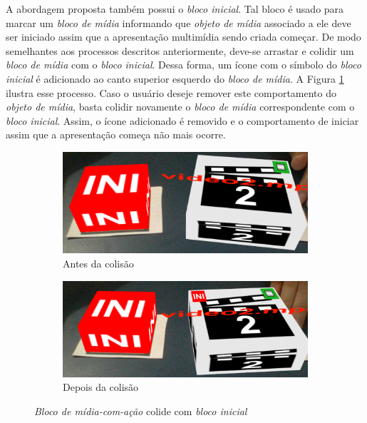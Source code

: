 \documentclass[../main.tex]{subfiles}
\begin{document}
A abordagem proposta também possui o \emph{bloco inicial}. Tal bloco é usado para marcar um \emph{bloco de mídia} informando que \emph{objeto de mídia} associado a ele deve ser iniciado assim que a apresentação multimídia sendo criada começar. De modo semelhantes aos processos descritos anteriormente, deve-se arrastar e colidir um \emph{bloco de mídia} com o \emph{bloco inicial}. Dessa forma, um ícone com o símbolo do \emph{bloco inicial} é adicionado ao canto superior esquerdo do \emph{bloco de mídia}. A Figura \ref{fig:inicial} ilustra esse processo. Caso o usuário deseje remover este comportamento do \emph{objeto de mídia}, basta colidir novamente o \emph{bloco de mídia} correspondente com o \emph{bloco inicial}. Assim, o ícone adicionado é removido e o comportamento de iniciar assim que a apresentação começa não mais ocorre.

\begin{figure}[!h]
  \begin{subfigure}{0.49\linewidth}
    \includegraphics[width=0.95\linewidth]{IMG/beforeINIR.png}
    \caption{Antes da colisão}
  \end{subfigure}
  \begin{subfigure}{0.49\linewidth}
    \includegraphics[width=0.95\linewidth]{IMG/afterINIR.png}
    \caption{Depois da colisão}
  \end{subfigure}
\caption{\textit{Bloco de mídia-com-ação} colide com \textit{bloco inicial}}
\label{fig:inicial}
\end{figure}
\end{document}
